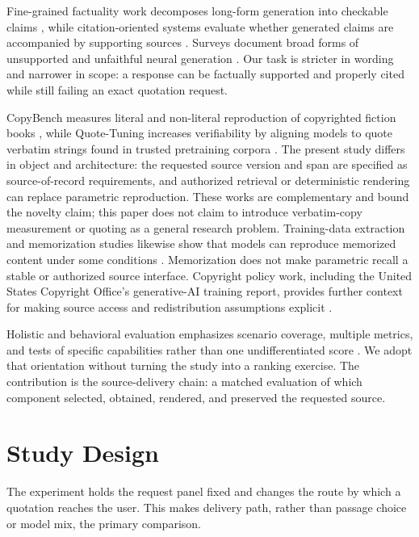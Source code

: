 \documentclass[11pt]{article}
\begin{document}
Fine-grained factuality work decomposes long-form generation into checkable
claims \citep{min2023factscore}, while citation-oriented systems evaluate
whether generated claims are accompanied by supporting sources
\citep{gao2023alce}. Surveys document broad forms of unsupported and
unfaithful neural generation \citep{ji2023survey,huang2023survey}. Our task is
stricter in wording and narrower in scope: a response can be factually
supported and properly cited while still failing an exact quotation request.

CopyBench measures literal and non-literal reproduction of copyrighted fiction books
\citep{chen2024copybench}, while Quote-Tuning increases verifiability by
aligning models to quote verbatim strings found in trusted pretraining corpora
\citep{zhang2025verifiable}. The present study differs in object and
architecture: the requested source version and span are specified as source-of-record
requirements, and authorized retrieval or deterministic rendering can replace
parametric reproduction. These works are complementary and bound the novelty
claim; this paper does not claim to introduce verbatim-copy measurement or
quoting as a general research problem. Training-data extraction and
memorization studies likewise show that models can reproduce memorized content
under some conditions
\citep{carlini2021extracting,carlini2023quantifying}. Memorization does not
make parametric recall a stable or authorized source interface. Copyright
policy work, including the United States Copyright Office's generative-AI
training report, provides further context for making source access and
redistribution assumptions explicit \citep{usco2025ai}.

Holistic and behavioral evaluation emphasizes scenario coverage, multiple
metrics, and tests of specific capabilities rather than one undifferentiated
score \citep{liang2022helm,ribeiro2020checklist}. We adopt that orientation
without turning the study into a ranking exercise. The contribution is the
source-delivery chain: a matched evaluation of which component selected,
obtained, rendered, and preserved the requested source.

\section{Study Design}
\label{sec:study-design}

The experiment holds the request panel fixed and changes the route by which a
quotation reaches the user. This makes delivery path, rather than passage choice
or model mix, the primary comparison.
\end{document}
